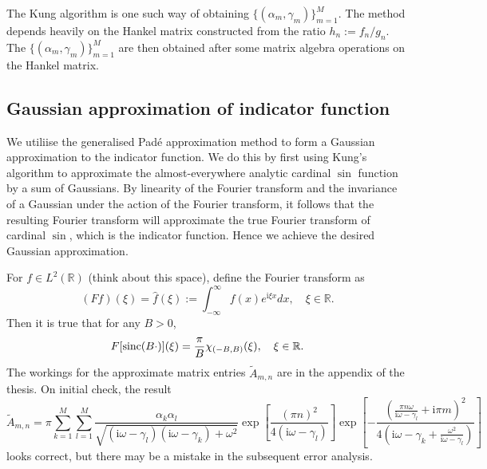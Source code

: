 \documentclass[11pt, a4paper]{article}
\newcommand{\be}{\begin{equation}}
\newcommand{\ee}{\end{equation}}
\newcommand{\R}{\mathbb{R}}
\newcommand{\im}{\text{i}}
\newcommand{\infint}{\int_{-\infty}^\infty}
\newcommand{\sinc}{\textnormal{sinc}}
\numberwithin{equation}{section}
\begin{document}
The Kung algorithm is one such way of obtaining $\{(\alpha_m, \gamma_m)\}_{m = 1}^M$. The method depends heavily on the Hankel matrix constructed from the ratio $h_n:=f_n/g_n$.  The $\{(\alpha_m, \gamma_m)\}_{m = 1}^M$ are then obtained after some matrix algebra operations on the Hankel matrix.

\subsection{Gaussian approximation of indicator function}
We utiliise the generalised Pad\'e approximation method to form a Gaussian approximation to the indicator function. We do this by first using Kung's algorithm to approximate the almost-everywhere analytic cardinal $\sin$ function by a sum of Gaussians. By linearity of the Fourier transform and the invariance of a Gaussian under the action of the Fourier transform, it follows that the resulting Fourier transform will approximate the true Fourier transform of cardinal $\sin$, which is the indicator function. Hence we achieve the desired Gaussian approximation.


For $f\in L^2(\R)$ (think about this space), define the Fourier transform as
\[
(Ff)(\xi) = \hat{f}(\xi) := \infint f(x)e^{\im\xi x}dx, \quad \xi\in\R.
\]
Then it is true that for any $B > 0$,
\[
F[\sinc(B\cdot)](\xi) = \frac{\pi}{B}\chi_{(-B, B)}(\xi), \quad\xi\in\R.
\]
The workings for the approximate matrix entries $\tilde{A}_{m, n}$ are in the appendix of the thesis. On initial check, the result
\be
\tilde{A}_{m, n} =\pi\sum_{k=1}^M\sum_{l=1}^M\frac{\alpha_{k}\alpha_{l}}{\sqrt{\left(\mathrm{i}\omega-\gamma_{l}\right)\left(\mathrm{i}\omega-\gamma_{k}\right)+\omega^{2}}}\exp\left[\frac{\left(\pi n\right)^{2}}{4\left(\mathrm{i}\omega-\gamma_{l}\right)}\right]\exp\left[-\frac{\left(\frac{\pi n\omega}{\mathrm{i}\omega-\gamma_{l}}+\mathrm{i}\pi m\right)^{2}}{4\left(\mathrm{i}\omega-\gamma_{k}+\frac{\omega^{2}}{\mathrm{i}\omega-\gamma_{l}}\right)}\right]\label{Approx_As}
\ee
looks correct, but there may be a mistake in the subsequent error analysis.
\end{document}
